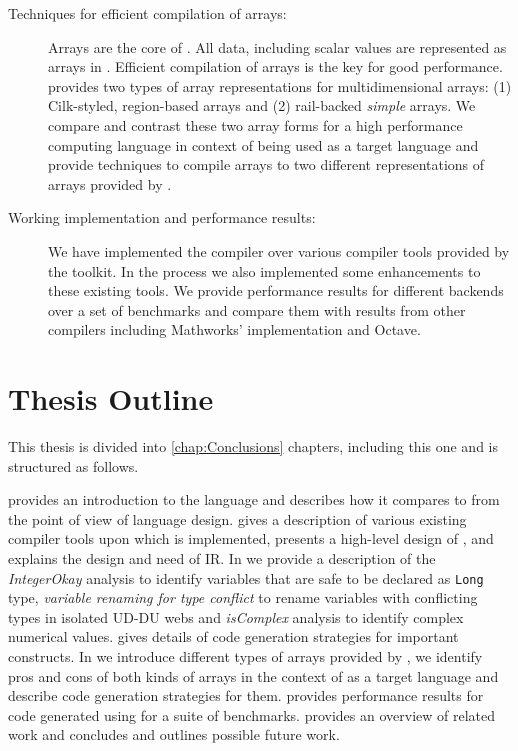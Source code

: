 \begin{description}
\item[Techniques for efficient compilation of \matlab arrays:] Arrays are
the core of \matlab. All data, including scalar values are represented
as arrays in \matlab. Efficient compilation of arrays is the key for
good performance. \xten provides two
types of array representations for multidimensional arrays: (1)
Cilk-styled, region-based arrays and (2) rail-backed \emph{simple} arrays. 
We compare
and contrast these two array forms for a high performance computing
language in context of being used as a target language and provide techniques
to compile \matlab arrays to two different representations of arrays provided
by \xten.

\item[Working implementation and performance results:] We have implemented the
\mixten compiler over various \matlab compiler tools provided by the \mclab
toolkit.
In the process we also implemented some enhancements to these existing tools.
We provide performance results for different \xten backends over a set
of benchmarks and compare them with results from other \matlab compilers
including Mathworks' \matlab implementation and Octave.

\end{description}

\section{Thesis Outline}

This thesis is divided into \ref{chap:Conclusions} chapters, including this one
and is structured as follows.

 provides an introduction to the \xten language and describes
how it compares to \matlab from the point of view of language design.
 gives a description of various existing \matlab
compiler tools upon which \mixten is implemented, presents a high-level
design of \mixten, and explains the design and need of \mixten IR.
In  we provide a description of the \emph{IntegerOkay}
analysis to identify variables that are safe to be declared as \texttt{Long}
type, \emph{variable renaming for type conflict} to rename variables with
conflicting types in isolated UD-DU webs and \emph{isComplex}
analysis to identify complex numerical values. 
 gives details of code generation strategies for
important \matlab constructs.
In  we introduce different types of arrays provided by
\xten,  we identify pros and cons of both kinds of arrays in the context of
\xten as a target language and describe code generation strategies for them.
 provides performance results for code generated using
\mixten for a suite of benchmarks.
 provides an overview of related work and
 concludes and outlines possible future work.
